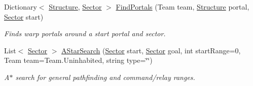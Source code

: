 \begin{DoxyCompactItemize}
Dictionary$<$ \hyperlink{class_structure}{Structure}, \hyperlink{class_sector}{Sector} $>$ \hyperlink{class_map_manager_aec6fadac270ce921e195dbb197ad6338}{Find\+Portals} (Team team, \hyperlink{class_structure}{Structure} portal, \hyperlink{class_sector}{Sector} start)
\begin{DoxyCompactList}\small\item\em Finds warp portals around a start portal and sector. \end{DoxyCompactList}\item 
List$<$ \hyperlink{class_sector}{Sector} $>$ \hyperlink{class_map_manager_ac1fa70e543427314f046c643fc225451}{A\+Star\+Search} (\hyperlink{class_sector}{Sector} start, \hyperlink{class_sector}{Sector} goal, int start\+Range=0, Team team=Team.\+Uninhabited, string type=\char`\"{}\char`\"{})
\begin{DoxyCompactList}\small\item\em A$\ast$ search for general pathfinding and command/relay ranges. \end{DoxyCompactList}\end{DoxyCompactItemize}
